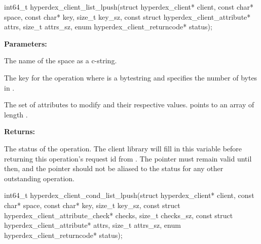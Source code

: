 \funcsep
{}
\begin{ccode}
int64_t hyperdex_client_list_lpush(struct hyperdex_client* client,
                const char* space,
                const char* key, size_t key_sz,
                const struct hyperdex_client_attribute* attrs, size_t attrs_sz,
                enum hyperdex_client_returncode* status);
\end{ccode}
\funcdesc 

\noindent\textbf{Parameters:}
\begin{description}[labelindent=\widthof{{\code{attrs}, \code{attrs\_sz}}},leftmargin=*,noitemsep,nolistsep,align=right]
\item[\code{space}] The name of the space as a c-string.
\item[\code{key}, \code{key\_sz}] The key for the operation where  is a bytestring and  specifies the number of bytes in .
\item[\code{attrs}, \code{attrs\_sz}] The set of attributes to modify and their respective values.   points to an array of length .
\end{description}

\noindent\textbf{Returns:}
\begin{description}[labelindent=\widthof{{\code{status}}},leftmargin=*,noitemsep,nolistsep,align=right]
\item[\code{status}] The status of the operation.  The client library will fill in this variable before returning this operation's request id from .  The pointer must remain valid until then, and the pointer should not be aliased to the status for any other outstanding operation.
\end{description}

\funcsep
{}
\begin{ccode}
int64_t hyperdex_client_cond_list_lpush(struct hyperdex_client* client,
                const char* space,
                const char* key, size_t key_sz,
                const struct hyperdex_client_attribute_check* checks, size_t checks_sz,
                const struct hyperdex_client_attribute* attrs, size_t attrs_sz,
                enum hyperdex_client_returncode* status);
\end{ccode}
\funcdesc 

